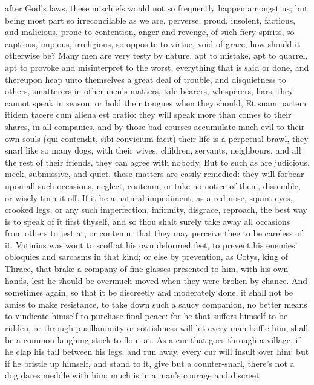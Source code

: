 {after God's laws, these mischiefs would not so frequently happen
amongst us; but being most part so irreconcilable as we are, perverse,
proud, insolent, factious, and malicious, prone to contention, anger
and revenge, of such fiery spirits, so captious, impious, irreligious,
so opposite to virtue, void of grace, how should it otherwise be? Many
men are very testy by nature, apt to mistake, apt to quarrel, apt to
provoke and misinterpret to the worst, everything that is said or done,
and thereupon heap unto themselves a great deal of trouble, and
disquietness to others, smatterers in other men's matters,
tale-bearers, whisperers, liars, they cannot speak in season, or hold
their tongues when they should, Et suam partem itidem tacere cum
aliena est oratio: they will speak more than comes to their shares, in
all companies, and by those bad courses accumulate much evil to their
own souls (qui contendit, sibi convicium facit) their life is a
perpetual brawl, they snarl like so many dogs, with their wives,
children, servants, neighbours, and all the rest of their friends, they
can agree with nobody. But to such as are judicious, meek, submissive,
and quiet, these matters are easily remedied: they will forbear upon
all such occasions, neglect, contemn, or take no notice of them,
dissemble, or wisely turn it off. If it be a natural impediment, as a
red nose, squint eyes, crooked legs, or any such imperfection,
infirmity, disgrace, reproach, the best way is to speak of it first
thyself, and so thou shalt surely take away all occasions from
others to jest at, or contemn, that they may perceive thee to be
careless of it. Vatinius was wont to scoff at his own deformed feet, to
prevent his enemies' obloquies and sarcasms in that kind; or else by
prevention, as Cotys, king of Thrace, that brake a company of fine
glasses presented to him, with his own hands, lest he should be
overmuch moved when they were broken by chance. And sometimes again, so
that it be discreetly and moderately done, it shall not be amiss to
make resistance, to take down such a saucy companion, no better means
to vindicate himself to purchase final peace: for he that suffers
himself to be ridden, or through pusillanimity or sottishness will let
every man baffle him, shall be a common laughing stock to flout at. As
a cur that goes through a village, if he clap his tail between his
legs, and run away, every cur will insult over him: but if he bristle
up himself, and stand to it, give but a counter-snarl, there's not a
dog dares meddle with him: much is in a man's courage and discreet
}
